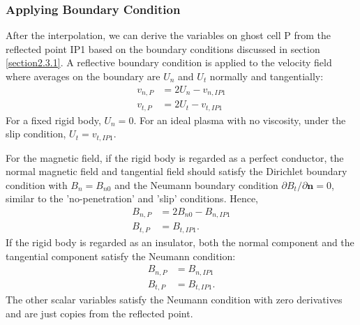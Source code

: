\subsubsection{Applying Boundary Condition}
After the interpolation, we can derive the variables on ghost cell P from the reflected point IP1 based on the boundary conditions discussed in section \ref{section2.3.1}. A reflective boundary condition is applied to the velocity field where averages on the boundary are $U_n$ and $U_t$ normally and tangentially:
\begin{align*}
v_{n,P} &= 2U_n - v_{n,IP1} \\
v_{t,P} &= 2U_t - v_{t,IP1}
\end{align*}
For a fixed rigid body, $U_n = 0$. For an ideal plasma with no viscosity, under the slip condition, $U_t = v_{t,IP1}$.

For the magnetic field, if the rigid body is regarded as a perfect conductor, the normal magnetic field and tangential field should satisfy the Dirichlet boundary condition with $B_n = B_{n0}$ and the Neumann boundary condition $\partial B_t / \partial \mathbf{n} = 0$, similar to the 'no-penetration' and 'slip' conditions. Hence,
\begin{align*}
B_{n,P} &= 2B_{n0} - B_{n,IP1} \\
B_{t,P} &= B_{t,IP1}.
\end{align*}
If the rigid body is regarded as an insulator, both the normal component and the tangential component satisfy the Neumann condition:
\begin{align*}
B_{n,P} &= B_{n,IP1} \\
B_{t,P} &= B_{t,IP1}.
\end{align*}
The other scalar variables satisfy the Neumann condition with zero derivatives and are just copies from the reflected point.